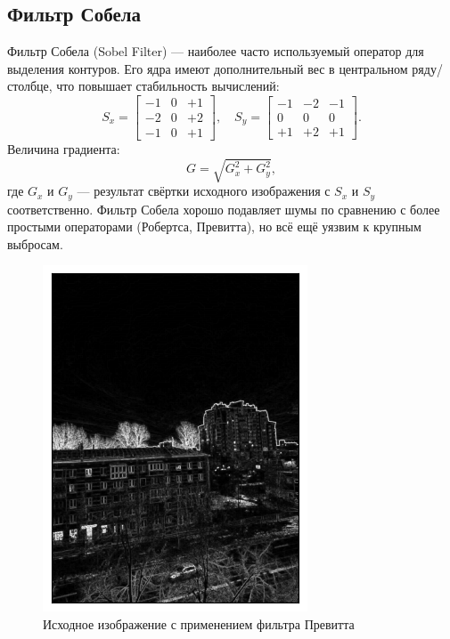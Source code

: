\documentclass[a4paper,12pt]{article}
\begin{document}
\subsection{Фильтр Собела}
Фильтр Собела (Sobel Filter) --- наиболее часто используемый оператор для выделения контуров. Его ядра имеют дополнительный вес в центральном ряду/столбце, что повышает стабильность вычислений:
\[
S_x = 
\begin{bmatrix}
-1 & 0 & +1 \\
-2 & 0 & +2 \\
-1 & 0 & +1 
\end{bmatrix},
\quad
S_y =
\begin{bmatrix}
-1 & -2 & -1 \\
0 &  0 &  0 \\
+1 & +2 & +1 
\end{bmatrix}.
\]
Величина градиента:
\[
G = \sqrt{G_x^2 + G_y^2},
\]
где \(G_x\) и \(G_y\) --- результат свёртки исходного изображения с \(S_x\) и \(S_y\) соответственно. Фильтр Собела хорошо подавляет шумы по сравнению с более простыми операторами (Робертса, Превитта), но всё ещё уязвим к крупным выбросам.
\begin{figure}[H]
    \centering \includegraphics[width=0.7\textwidth]{results/hpf_3.png}
    \caption{Исходное изображение с применением фильтра Превитта}
\end{figure}
\end{document}
